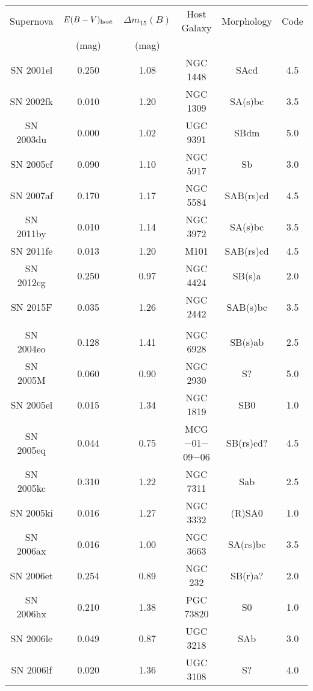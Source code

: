 \begin{tabular}{|c|c|c|c|c|c|}
\hline
Supernova & $E(B-V)_{\rm host}$ & $\Delta m_{15}(B)$ & Host Galaxy & Morphology & Code \\ 
 & (mag) & (mag) &  & & \\
\hline
SN 2001el & 0.250 & 1.08 & NGC 1448                  & SAcd       & 4.5 \\
SN 2002fk & 0.010 & 1.20 & NGC 1309                  & SA(s)bc    & 3.5 \\
SN 2003du & 0.000 & 1.02 & UGC 9391                  & SBdm       & 5.0 \\
SN 2005cf & 0.090 & 1.10 & NGC 5917                  & Sb         & 3.0 \\
SN 2007af & 0.170 & 1.17 & NGC 5584                  & SAB(rs)cd  & 4.5 \\
SN 2011by & 0.010 & 1.14 & NGC 3972                  & SA(s)bc    & 3.5 \\
SN 2011fe & 0.013 & 1.20 & M101                      & SAB(rs)cd  & 4.5 \\
SN 2012cg & 0.250 & 0.97 & NGC 4424                  & SB(s)a     & 2.0 \\
SN 2015F  & 0.035 & 1.26 & NGC 2442                  & SAB(s)bc   & 3.5 \\
 & & & & & \\
SN 2004eo & 0.128 & 1.41 & NGC 6928                  & SB(s)ab    & 2.5 \\
SN 2005M  & 0.060 & 0.90 & NGC 2930                  & S?         & 5.0 \\
SN 2005el & 0.015 & 1.34 & NGC 1819                  & SB0        & 1.0 \\
SN 2005eq & 0.044 & 0.75 & MCG $-$01$-$09$-$06       & SB(rs)cd?  & 4.5 \\
SN 2005kc & 0.310 & 1.22 & NGC 7311                  & Sab        & 2.5 \\
SN 2005ki & 0.016 & 1.27 & NGC 3332                  & (R)SA0     & 1.0 \\
SN 2006ax & 0.016 & 1.00 & NGC 3663                  & SA(rs)bc   & 3.5 \\
SN 2006et & 0.254 & 0.89 & NGC 232                   & SB(r)a?    & 2.0 \\
SN 2006hx & 0.210 & 1.38 & PGC 73820                 & S0         & 1.0 \\
SN 2006le & 0.049 & 0.87 & UGC 3218                  & SAb        & 3.0 \\
SN 2006lf & 0.020 & 1.36 & UGC 3108                  & S?         & 4.0 \\

\end{tabular}
